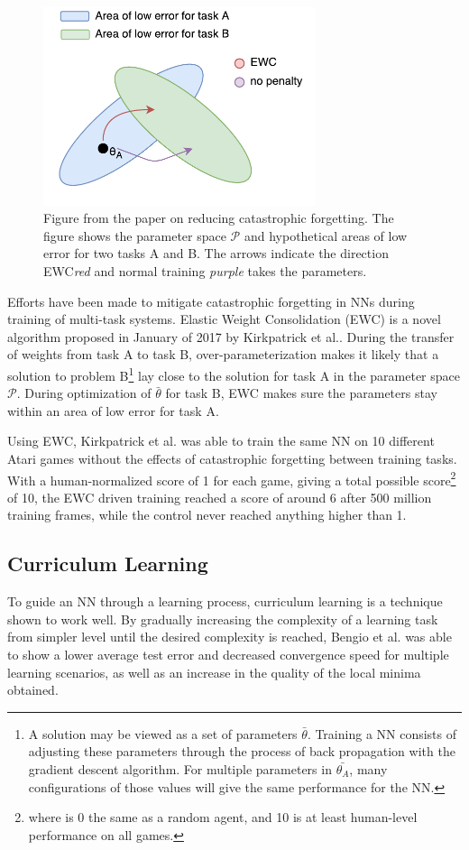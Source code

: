 \documentclass[a4paper,english]{report}
\begin{document}
\begin{figure}[]
    \label{fig:ewc}
    \centering
    \includegraphics[width=8cm]{figures/EWC.pdf}
    \caption{Figure from the paper on reducing catastrophic forgetting\cite{ewc}. The figure shows the parameter space \(\mathcal{P}\) and hypothetical areas of low error for two tasks A and B. The arrows indicate the direction EWC\textit{red} and normal training \textit{purple} takes the parameters.}
\end{figure}
\label{section:ewc}
Efforts have been made to mitigate catastrophic forgetting in NNs during training of multi-task systems. Elastic Weight Consolidation (EWC) is a novel algorithm proposed in January of 2017 by Kirkpatrick et al.\cite{ewc}. During the transfer of weights from task A to task B, over-parameterization makes it likely that a solution to problem B\footnote{A solution may be viewed as a set of parameters \(\bar{\theta}\). Training a NN consists of adjusting these parameters through the process of back propagation with the gradient descent algorithm. For multiple parameters in \(\bar{\theta_A}\), many configurations of those values will give the same performance for the NN.} lay close to the solution for task A in the parameter space \(\mathcal{P}\). During optimization of \(\bar{\theta}\) for task B, EWC makes sure the parameters stay within an area of low error for task A.

Using EWC, Kirkpatrick et al.\cite{ewc} was able to train the same NN on 10 different Atari games without the effects of catastrophic forgetting between training tasks. With a human-normalized score of 1 for each game, giving a total possible score\footnote{where is 0 the same as a random agent, and 10 is at least human-level performance on all games.} of 10, the EWC driven training reached a score of around 6 after 500 million training frames, while the control never reached anything higher than 1.


\subsection{Curriculum Learning}
To guide an NN through a learning process, curriculum learning is a technique shown to work well. By gradually increasing the complexity of a learning task from simpler level until the desired complexity is reached, Bengio et al. \cite{curriculumlearning} was able to show a lower average test error and decreased convergence speed for multiple learning scenarios, as well as an increase in the quality of the local minima obtained.
\end{document}
